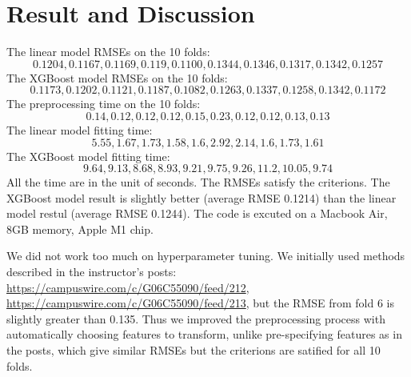 \documentclass[12pt]{article}
\theoremstyle{plain}
\begin{document}
\section{Result and Discussion}
The linear model RMSEs on the 10 folds: 
\begin{equation}
0.1204, 0.1167, 0.1169, 0.119, 0.1100, 0.1344, 0.1346, 0.1317, 0.1342, 0.1257
\end{equation}
The XGBoost model RMSEs on the 10 folds: 
\begin{equation}
0.1173, 0.1202, 0.1121, 0.1187, 0.1082, 0.1263, 0.1337, 0.1258, 0.1342, 0.1172
\end{equation}
The preprocessing time on the 10 folds:
\begin{equation}
0.14, 0.12, 0.12, 0.12, 0.15, 0.23, 0.12, 0.12, 0.13, 0.13
\end{equation}
The linear model fitting time:
\begin{equation}
5.55, 1.67, 1.73, 1.58, 1.6, 2.92, 2.14, 1.6, 1.73, 1.61
\end{equation}
The XGBoost model fitting time:
\begin{equation}
9.64, 9.13, 8.68, 8.93, 9.21, 9.75, 9.26, 11.2, 10.05, 9.74
\end{equation}
All the time are in the unit of seconds. The RMSEs satisfy the criterions. The XGBoost model result is slightly better (average RMSE 0.1214) than the linear model restul (average RMSE 0.1244). The code is excuted on a Macbook Air, 8GB memory, Apple M1 chip.

We did not work too much on hyperparameter tuning. We initially used methods described in the instructor's posts: \url{https://campuswire.com/c/G06C55090/feed/212}, \url{https://campuswire.com/c/G06C55090/feed/213}, but the RMSE from fold 6 is slightly greater than 0.135. Thus we improved the preprocessing process with automatically choosing features to transform, unlike pre-specifying features as in the posts, which give similar RMSEs but the criterions are satified for all 10 folds.
\end{document}

